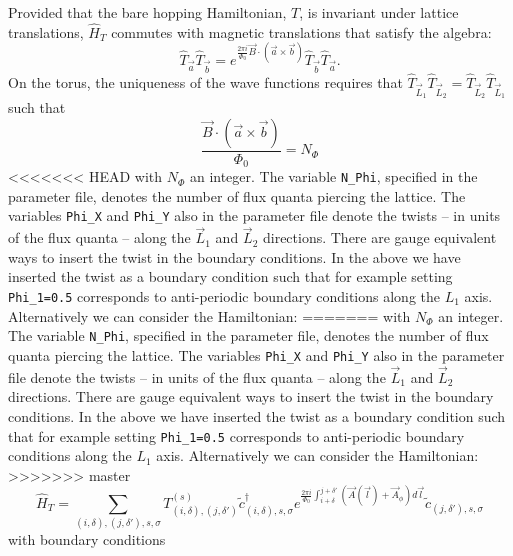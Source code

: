 Provided that the bare hopping Hamiltonian, $T$,  is invariant under lattice translations, $\hat{H}_T$ commutes with magnetic translations that satisfy the algebra:
\begin{equation}
\hat{T}_{\vec{a}} \hat{T}_{\vec{b}} =  e^{ \frac{2 \pi i}{\Phi_0}   \vec{B} \cdot \left( \vec{a} \times \vec{b} \right) }  \hat{T}_{\vec{b}} \hat{T}_{\vec{a}}. 
\end{equation}
On the  torus, the uniqueness of the wave functions requires that  $\hat{T}_{\vec{L}_1} \hat{T}_{\vec{L}_2}  =   \hat{T}_{\vec{L}_2} \hat{T}_{\vec{L}_1} $ such
that
\begin{equation}
\frac{\vec{B} \cdot \left( \vec{a} \times \vec{b}  \right) }{\Phi_0 } = N_{\Phi}   
\end{equation}
<<<<<<< HEAD
with  $N_\Phi $ an integer.  The variable \texttt{N\_Phi},   specified in the parameter file,   denotes the number of flux quanta piercing the lattice.    The variables \texttt{Phi\_X}  and   \texttt{Phi\_Y} also   in the parameter file denote  the twists  -- in units of the flux quanta  --  along the $\vec{L}_1$ and  $\vec{L}_2$ directions.
There are gauge  equivalent ways to insert the  twist in the boundary conditions.
In the above we  have inserted the twist as a boundary condition such  that for example setting  \texttt{Phi\_1=0.5}  corresponds to anti-periodic boundary conditions along the $L_1$  axis.   Alternatively we  can  consider the 
Hamiltonian:
=======
with  $N_\Phi $ an integer.  The variable \texttt{N\_Phi},   specified in the parameter file,   denotes the number of flux quanta piercing the lattice.    The variables \texttt{Phi\_X}  and   \texttt{Phi\_Y} also   in the parameter file denote  the twists  -- in units of the flux quanta  --  along the $\vec{L}_1$ and  $\vec{L}_2$ directions.     There are gauge  equivalent ways to insert the  twist in the boundary conditions. In the above we  have inserted the twist as a boundary condition such that for example setting \texttt{Phi\_1=0.5}  corresponds to anti-periodic boundary conditions along the $L_1$  axis.
Alternatively we can consider the Hamiltonian:
>>>>>>> master
\begin{equation}
\hat{H}_T = \sum_{(i,\delta), (j,\delta'), s, \sigma}    T_{(i,\delta), (j,\delta')}^{(s)}    \tilde{c}^{\dagger}_{(i,\delta),s,\sigma }   e^{\frac{2 \pi i}{\Phi_0} \int_{i + \delta}^{j + \delta'} \left(  \vec{A}(\vec{l})  + \vec{A}_{\phi} \right)  d \vec{l}} \tilde{c}^{}_{(j,\delta'),s,\sigma }
\end{equation}
with boundary conditions 
